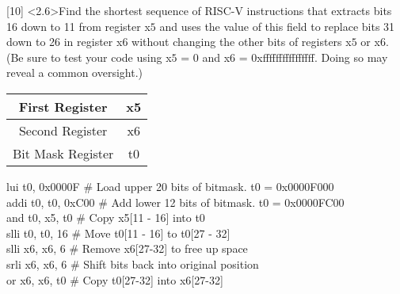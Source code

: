 \documentclass[12pt]{article}
\begin{document}
		
		
		
		
		\newpage
		
		
		
		
		
		\noindent {} 
		[10] \textless2.6\textgreater Find the shortest sequence of RISC-V instructions that extracts bits 16 down to 11 from register x$5$ and uses the value of this field to replace bits 31 down to 26 in register x$6$ without changing the other bits of registers x$5$ or x$6$. (Be sure to test your code using x$5$ = 0 and x$6$ = 0xffffffffffffffff. Doing so may reveal a common oversight.) \vspace{0.15cm} \\
		
		\begin{center}
			\begin{tabular}{ |c|c| } 
				\hline
				First Register & x5 \\
				\hline
				Second Register & x6 \\
				\hline
				Bit Mask Register & t0 \\
				\hline
			\end{tabular}
			
			\vspace{0.6cm}
			\begin{flushleft}
				\hspace{0.4cm} lui t0, 0x0000F \hspace{0.43cm} \# Load upper 20 bits of bitmask. t0 = 0x0000F000\\
				\hspace{0.4cm} addi t0, t0, 0xC00 \# Add lower 12 bits of bitmask. t0 = 0x0000FC00\\
				\hspace{0.4cm} and t0, x5, t0 \hspace{0.7cm} \# Copy x5[11 - 16] into t0 \\
				\hspace{0.4cm} slli t0, t0, 16 \hspace{0.88cm} \# Move t0[11 - 16] to t0[27 - 32] \\
				\hspace{0.4cm} slli x6, x6, 6 \hspace{0.99cm} \# Remove x6[27-32] to free up space \\
				\hspace{0.4cm} srli x6, x6, 6 \hspace{1.15cm}\# Shift bits back into original position\\
				\hspace{0.4cm} or x6, x6, t0  \hspace{0.99cm} \# Copy t0[27-32] into x6[27-32] \\
			\end{flushleft}
		\end{center}
	
\end{document}
